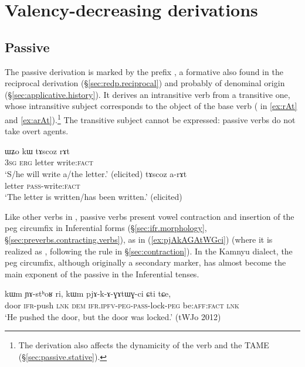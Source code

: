 \chapter{Valency-decreasing derivations}  \label{chap:valency.decreasing.derivation}

 
\section{Passive} \label{sec:passive}
   
The passive derivation is marked by the prefix  , a formative also found in the reciprocal derivation (§\ref{sec:redp.reciprocal}) and probably of denominal origin (§\ref{sec:applicative.history}). It derives an intransitive verb from a transitive one, whose intransitive subject corresponds to the object of the base verb ( in \ref{ex:rAt} and \ref{ex:arAt}).\footnote{The derivation also affects the dynamicity of the verb and the TAME (§\ref{sec:passive.stative}). } The transitive subject cannot be expressed: passive verbs do not take overt agents.

\begin{exe}
	\ex 
	\begin{xlist}	
		\ex \label{ex:rAt}
		\gll ɯʑo kɯ tɤscoz rɤt \\
		\textsc{3sg} \textsc{erg} letter write:\textsc{fact} \\
		\glt `S/he will write a/the letter.' (elicited)
		\ex \label{ex:arAt}
		\gll tɤscoz a-rɤt \\
		letter \textsc{pass}-write:\textsc{fact} \\
		\glt `The letter is written/has been written.' (elicited)
	\end{xlist}	
\end{exe}


Like other verbs in , passive verbs present vowel contraction and insertion of the peg circumfix  in Inferential forms (§\ref{sec:ifr.morphology}, §\ref{sec:preverbs.contracting.verbs}), as in (\ref{ex:pjAkAGAtWGci}) (where it is realized as , following the rule in §\ref{sec:contraction}). In the Kamnyu dialect, the peg circumfix, although originally a secondary marker, has almost become the main exponent of the passive in the Inferential tenses.

\begin{exe}
\ex \label{ex:pjAkAGAtWGci}
 \gll kɯm ɲɤ-stʰoʁ ri, kɯm pjɤ-k-ɤ-ɣɤtɯɣ-ci ɕti tɕe,  \\
 door \textsc{ifr}-push \textsc{lnk} \textsc{dem} \textsc{ifr}.\textsc{ipfv}-\textsc{peg}-\textsc{pass}-lock-\textsc{peg} be:\textsc{aff}:\textsc{fact} \textsc{lnk} \\
\glt  `He pushed the door, but the door was locked.' (tWJo 2012) 
\end{exe} 

